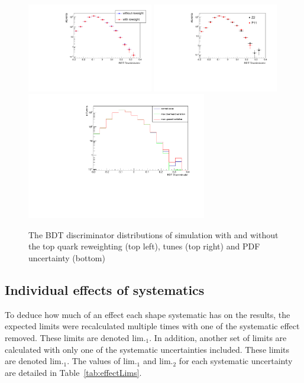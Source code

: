 \begin{figure}[ht!]
\centering
    \includegraphics[width=0.49\textwidth]{images/Run1/ptrw_xcheck.pdf}
    \includegraphics[width=0.49\textwidth]{images/Run1/NomTune_Mu_Log.pdf}\\
        \includegraphics[width=0.7\textwidth]{images/Run1/PDF_uncertainty_mu.pdf}
    \caption{The BDT discriminator distributions of \ttbar simulation with and without the top quark \pt reweighting (top left), \PYTHIA tunes (top right) and PDF uncertainty (bottom)}
    \label{fig:studies8}
\end{figure}


\subsection{Individual effects of systematics}

To deduce how much of an effect each shape systematic has on the results, the expected limits were recalculated multiple times with one of the systematic effect removed. These limits are denoted lim.$_{1}$. In addition, another set of limits are calculated with only one of the systematic uncertainties included. These limits are denoted lim.$_{1}$. The values of lim.$_{1}$ and lim.$_{2}$ for each systematic uncertainty are detailed in Table~\ref{tab:effectLims}.

